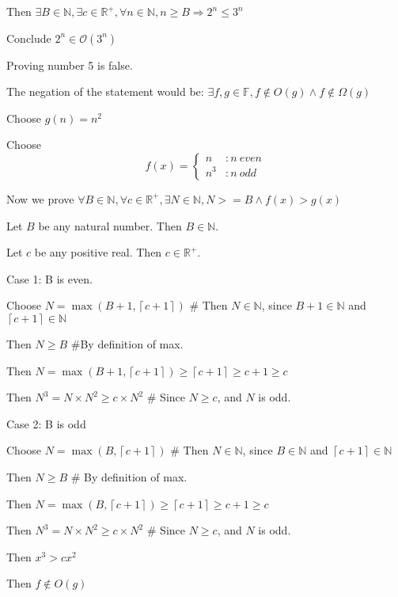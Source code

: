 \documentclass{article}
\begin{document}
\begin{enumerate}
\begin{description}
\begin{description}
	\end{description}
	\item Then $\exists B \in \mathbb{N}, \exists c \in \mathbb{R}^+, \forall n \in \mathbb{N}, n \geq B \Rightarrow 2^n \leq 3^n$
	\item Conclude $2^n \in \mathcal{O}(3^n)$
\end {description}
\item Proving number 5 is false.
\begin{description}
	\item The negation of the statement would be: $\exists f,g \in \mathbb{F}, f\notin O(g) \wedge f \notin \Omega (g)$
	\item Choose $g(n) = n^2$
	\item Choose
	\begin {displaymath}
		f(x)= \left\{
			\begin{array}{lr}
				n   &: n\  even\\
				n^3 &: n\  odd
			\end{array}
		\right.
	\end {displaymath}
	\item Now we prove $\forall B \in \mathbb{N}, \forall c \in \mathbb{R}^+, \exists N \in \mathbb{N}, N >= B \wedge f(x) > g(x)$
	\item Let $B$ be any natural number. Then $B \in \mathbb{N}$.
	\item Let $c$ be any positive real. Then $c \in \mathbb{R}^+$.
	\item Case 1: B is even.
	\begin {description}
		\item Choose $N = \max(B+1,\left\lceil c + 1\right\rceil)$ \# Then $N \in \mathbb{N}$, since $B+1 \in \mathbb{N}$ and $\left\lceil c + 1\right\rceil \in \mathbb{N}$
		\item Then $N \geq B$ \#By definition of max.
		\item Then $N = \max(B+1,\left\lceil c + 1\right\rceil) \geq \left\lceil c + 1\right\rceil \geq c + 1 \geq c$
		\item Then $N^3 = N \times N^2 \geq c\times N^2$ \# Since $N \geq c$, and $N$ is odd. 
	\end {description}
	\item Case 2: B is odd
	\begin {description}
		\item Choose $N = \max(B,\left\lceil c + 1\right\rceil)$ \# Then $N \in \mathbb{N}$, since $B \in \mathbb{N}$ and $\left\lceil c + 1\right\rceil \in \mathbb{N}$
		\item Then $N \geq B$ \# By definition of max.
		\item Then $N = \max(B,\left\lceil c + 1\right\rceil) \geq \left\lceil c + 1\right\rceil \geq c+1 \geq c$
		\item Then $N^3 = N \times N^2 \geq c\times N^2$ \# Since $N \geq c$, and $N$ is odd.
	\end {description}
	\item Then $x^3 > cx^2$
	\item Then $f \notin O(g)$
	

\end{description}
\end{enumerate}
\end{document}
